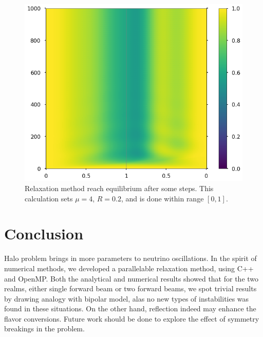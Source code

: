 \begin{figure}
    \centering
    \includegraphics[width=\textwidth]{chapters/assets/halo/relax-color.png}
    \caption{Relaxation method reach equilibrium after some steps. This calculation sets $\mu = 4$, $R=0.2$, and is done within range $[0,1]$.}
    \label{chap:halo-sec:num-fig:relax-color}
\end{figure}





\section{Conclusion}

Halo problem brings in more parameters to neutrino oscillations. In the spirit of numerical methods, we developed a parallelable relaxation method, using C++ and OpenMP. Both the analytical and numerical results showed that for the two realms, either single forward beam or two forward beams, we spot trivial results by drawing analogy with bipolar model, alas no new types of instabilities was found in these situations. On the other hand, reflection indeed may enhance the flavor conversions. Future work should be done to explore the effect of symmetry breakings in the problem.